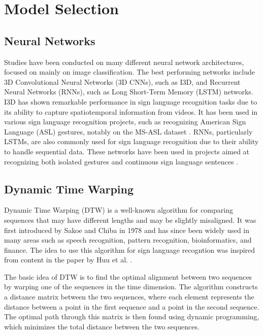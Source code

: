 \documentclass[final,rdr32.tex]{subfiles}
\begin{document}
\section{Model Selection}

\subsection{Neural Networks}

Studies have been conducted on many different neural network architectures, focused
on mainly on image classification. The best performing networks include 3D Convolutional Neural Networks (3D CNNs), such as I3D, and Recurrent Neural Networks (RNNs), such as Long Short-Term Memory (LSTM) networks. I3D has shown remarkable performance in sign language recognition tasks due to its ability to capture spatiotemporal information from videos. It has been used in various sign language recognition projects, such as recognizing American Sign Language (ASL) gestures, notably on the MS-ASL dataset \cite{joze2018ms}. RNNs, particularly LSTMs, are also commonly used for sign language recognition due to their ability to handle sequential data. These networks have been used in projects aimed at recognizing both isolated gestures \cite{liu2016sign} and continuous sign language sentences \cite{guo2018hierarchical}.

\subsection{Dynamic Time Warping}

Dynamic Time Warping (DTW) is a well-known algorithm for comparing sequences that may have different lengths and may be slightly misaligned. It was first introduced by Sakoe and Chiba in 1978 \cite{sakoe1978dynamic} and has since been widely used in many areas such as speech recognition, pattern recognition, bioinformatics, and finance. The idea to use this algorithm for sign language recogntion was inspired from content in the paper by Huu et al. \cite{huu2014human}.

The basic idea of DTW is to find the optimal alignment between two sequences by warping one of the sequences in the time dimension. The algorithm constructs a distance matrix between the two sequences, where each element represents the distance between a point in the first sequence and a point in the second sequence. The optimal path through this matrix is then found using dynamic programming, which minimizes the total distance between the two sequences.
\end{document}
